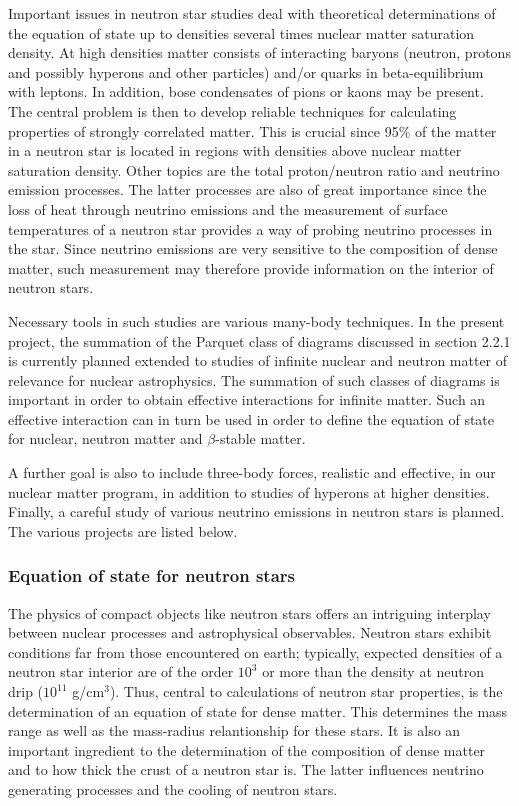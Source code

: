 Important issues in neutron star studies deal with theoretical
determinations of the equation of state up to densities
several times nuclear matter saturation density.
At high densities matter consists of interacting baryons (neutron, protons
and possibly hyperons and other particles) and/or quarks in beta-equilibrium
with leptons.
In addition, bose condensates of pions or kaons may be present.
The central  problem is then 
to develop reliable techniques for calculating
properties of strongly correlated matter. This is crucial since
95\% of the matter in a neutron star is located in regions with 
densities above nuclear matter saturation density.
Other topics are
the total proton/neutron ratio and neutrino emission processes.
The latter processes are also of great importance since the loss of heat
through neutrino emissions and the measurement of surface temperatures
of a neutron star provides a way of probing neutrino processes
in the star. Since neutrino emissions are very sensitive to the composition
of dense matter,  such measurement may therefore provide information
on the interior of neutron stars. 

Necessary tools in such studies are various many-body techniques.
In the present project,  
the summation of the Parquet class of diagrams discussed in section 2.2.1 is 
currently planned extended 
to studies of infinite nuclear and neutron matter of relevance 
for nuclear astrophysics. 
The summation of such classes of diagrams is important
in order to obtain effective interactions for infinite matter.
Such an effective interaction can in turn be used
in order to define the equation of state for nuclear,
neutron matter and $\beta$-stable matter.

A further goal is also to include three-body forces, realistic
and effective, in our nuclear matter program, in addition to studies
of hyperons at higher densities.
Finally, a careful study of various neutrino emissions in neutron
stars is planned. The various projects are listed below.

\subsubsection{Equation of state for neutron stars}

The physics of compact objects like neutron stars offers
an intriguing interplay between nuclear processes  and
astrophysical observables.
Neutron stars exhibit conditions far from those encountered on earth;
typically, expected densities of a neutron star interior are of the
order $10^3$ or more than the density 
at neutron drip  ($10^{11}$ g/cm$^{3}$).
Thus, central to calculations of neutron star properties, is the
determination of an equation of state for dense matter. This determines
the mass range as well as the mass-radius relantionship for these stars.
It is also an important ingredient to the determination of the
composition of dense matter and to how
thick the crust of a neutron star is.
The latter influences neutrino generating processes and the cooling
of neutron stars.

